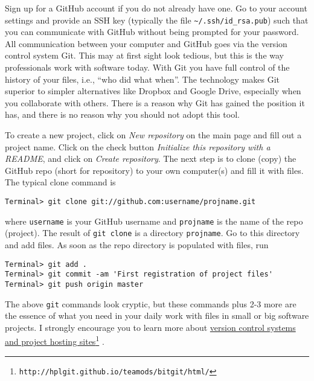 \documentclass[graybox,sectrefs,envcountresetchap,open=right,final]{svmonodo}
\begin{document}
Sign up for a GitHub account if you do not already have one.
Go to your account settings and provide an SSH key (typically
the file \Verb!~/.ssh/id_rsa.pub!) such that
you can communicate with GitHub without being prompted for your password.
All communication between your computer and GitHub goes via the version
control system Git. This may at first sight look tedious, but
this is the way professionals work with software today. With Git you
have full control of the history of your files, i.e., ``who did what when''.
The technology makes Git superior to simpler alternatives
like Dropbox and Google Drive,
especially when you collaborate with others.
There is a reason why Git has gained the position it has,
and there is no reason why you should not adopt this tool.

To create a new project, click on \emph{New repository} on the main page and
fill out a project name. Click on the check button \emph{Initialize this
repository with a README}, and click on \emph{Create repository}. The next
step is to clone (copy) the GitHub repo (short for repository) to
your own computer(s) and fill it with files. The typical clone command is



\begin{Verbatim}[frame=lines,label=\fbox{{\tiny Terminal}},framesep=2.5mm,framerule=0.7pt,fontsize=\fontsize{9pt}{9pt}]
Terminal> git clone git://github.com:username/projname.git

\end{Verbatim}

where \texttt{username} is your GitHub username and \texttt{projname} is the
name of the repo (project). The result of \texttt{git clone} is a
directory \texttt{projname}. Go to this directory and add files.
As soon as the repo directory is populated with files, run





\begin{Verbatim}[frame=lines,label=\fbox{{\tiny Terminal}},framesep=2.5mm,framerule=0.7pt,fontsize=\fontsize{9pt}{9pt}]
Terminal> git add .
Terminal> git commit -am 'First registration of project files'
Terminal> git push origin master

\end{Verbatim}

The above \texttt{git} commands look cryptic, but these commands plus
2-3 more are the essence of what you need in your daily work with
files in small or big
software projects. I strongly encourage you to
learn more about \href{{http://hplgit.github.io/teamods/bitgit/html/}}{version control systems and project hosting
sites}\footnote{\texttt{http://hplgit.github.io/teamods/bitgit/html/}}
\cite{Langtangen_bitgit}.
\end{document}
